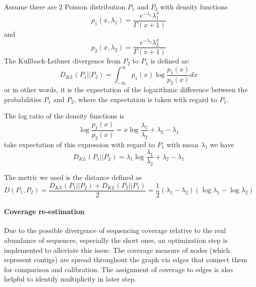 Assume there are 2 Poisson distribution $P_1$ and $P_2$ with density functions 
\begin{equation}
    p_1(x,\lambda_1)=\frac{e^{-\lambda_1}\lambda_1^x}{\Gamma(x+1)}
\end{equation}
and 
\begin{equation}
    p_2(x,\lambda_2)=\frac{e^{-\lambda_2}\lambda_2^x}{\Gamma(x+1)}
\end{equation}
The Kullback-Leibner divergence from $P_2$ to $P_1$ is defined as:
\begin{equation}
    D_{KL}(P_1||P_2)=\int_{-\infty}^{\infty} p_1(x)\log{\frac{p_1(x)}{p_2(x)}} dx
\end{equation}
or in other words,  it is the expectation of the logarithmic difference between the probabilities $P_1$ and $P_2$, where the expectation is taken with regard to $P_1$.

The log ratio of the density functions is
\begin{equation}
\log{\frac{p_1(x)}{p_2(x)}}=x\log{\frac{\lambda_1}{\lambda_2}}+\lambda_2-\lambda_1
\end{equation}
take expectation of this expression with regard to $P_1$ with mean $\lambda_1$ we have
\begin{equation}
D_{KL}(P_1||P_2)=\lambda_1\log{\frac{\lambda_1}{\lambda_2}}+\lambda_2-\lambda_1
\end{equation}

The metric we used is the distance defined as
\begin{equation}
D(P_1,P_2)=\frac{D_{KL}(P_1||P_2)+D_{KL}(P_2||P_1)}{2}=\frac{1}{2}(\lambda_1-\lambda_2)(\log{\lambda_1}-\log{\lambda_2})
\end{equation}

\paragraph{Coverage re-estimation}
Due to the possible divergence of sequencing coverage relative to the real abundance of sequences, especially the short ones, an optimization step is implemented to alleviate this issue. The coverage measure of nodes (which represent contigs) are spread throughout the graph via edges that connect them for comparison and calibration. 
The assignment of coverage to edges is also helpful to identify multiplicity in later step. 

